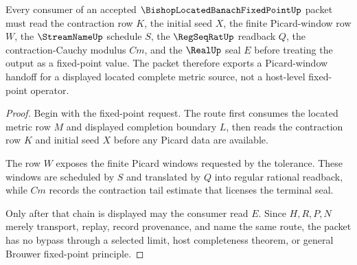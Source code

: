 \begin{theorem}
\label{thm:bishop-located-banach-fixed-point-picard-window-handoff}
Every consumer of an accepted $\BishopLocatedBanachFixedPointUp$ packet must read the contraction row $K$, the initial seed $X$, the finite Picard-window row $W$, the $\StreamNameUp$ schedule $S$, the $\RegSeqRatUp$ readback $Q$, the contraction-Cauchy modulus $Cm$, and the $\RealUp$ seal $E$ before treating the output as a fixed-point value. The packet therefore exports a Picard-window handoff for a displayed located complete metric source, not a host-level fixed-point operator.
\end{theorem}
\begin{proof}
Begin with the fixed-point request. The route first consumes the located metric row $M$ and displayed completion boundary $L$, then reads the contraction row $K$ and initial seed $X$ before any Picard data are available.

The row $W$ exposes the finite Picard windows requested by the tolerance. These windows are scheduled by $S$ and translated by $Q$ into regular rational readback, while $Cm$ records the contraction tail estimate that licenses the terminal seal.

Only after that chain is displayed may the consumer read $E$. Since $H,R,P,N$ merely transport, replay, record provenance, and name the same route, the packet has no bypass through a selected limit, host completeness theorem, or general Brouwer fixed-point principle.
\end{proof}



